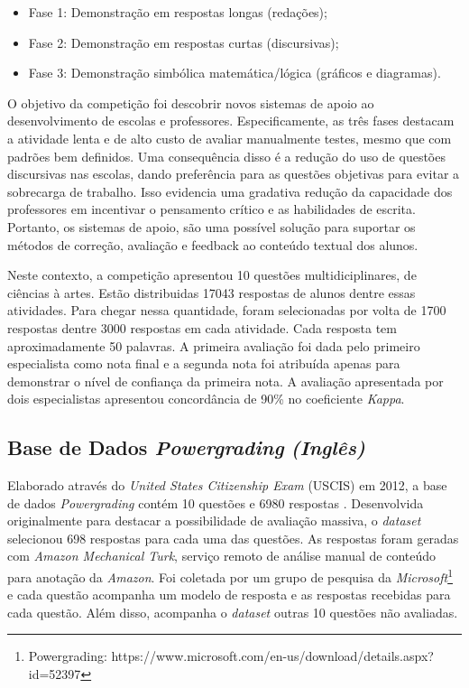 \begin{itemize}
\item Fase 1:  Demonstração em respostas longas (redações); 
\item Fase 2:  Demonstração em respostas curtas (discursivas);
\item Fase 3:  Demonstração simbólica matemática/lógica (gráficos e diagramas).
\end{itemize}

O objetivo da competição foi descobrir novos sistemas de apoio ao desenvolvimento de escolas e professores. Especificamente, as três fases destacam a atividade lenta e de alto custo de avaliar manualmente testes, mesmo que com padrões bem definidos. Uma consequência disso é a redução do uso de questões discursivas nas escolas, dando preferência para as questões objetivas para evitar a sobrecarga de trabalho. Isso evidencia uma gradativa redução da capacidade dos professores em incentivar o pensamento crítico e as habilidades de escrita. Portanto, os sistemas de apoio, são uma possível solução para suportar os métodos de correção, avaliação e feedback ao conteúdo textual dos alunos.

Neste contexto, a competição apresentou 10 questões multidiciplinares, de ciências à artes. Estão distribuidas 17043 respostas de alunos dentre essas atividades. Para chegar nessa quantidade, foram selecionadas por volta de 1700 respostas dentre 3000 respostas em cada atividade. Cada resposta tem aproximadamente 50 palavras. A primeira avaliação foi dada pelo primeiro especialista como nota final e a segunda nota foi atribuída apenas para demonstrar o nível de confiança da primeira nota. A avaliação apresentada por dois especialistas apresentou concordância de 90\% no coeficiente \textit{Kappa}.


\subsection{Base de Dados \textit{Powergrading} \textit{(Inglês)}}
\label{powergrading-db}
Elaborado através do \textit{United States Citizenship Exam} (USCIS) em 2012, a base de dados \textit{Powergrading} contém 10 questões e 6980 respostas \cite{basu2013}. Desenvolvida originalmente para destacar a possibilidade de avaliação massiva, o \textit{dataset} selecionou 698 respostas para cada uma das questões. As respostas foram geradas com \textit{Amazon Mechanical Turk}, serviço remoto de análise manual de conteúdo para anotação da \textit{Amazon}. Foi coletada por um grupo de pesquisa da \textit{Microsoft}\footnote{Powergrading: https://www.microsoft.com/en-us/download/details.aspx?id=52397} e cada questão acompanha um modelo de resposta e as respostas recebidas para cada questão.  Além disso, acompanha o \textit{dataset} outras 10 questões não avaliadas.

